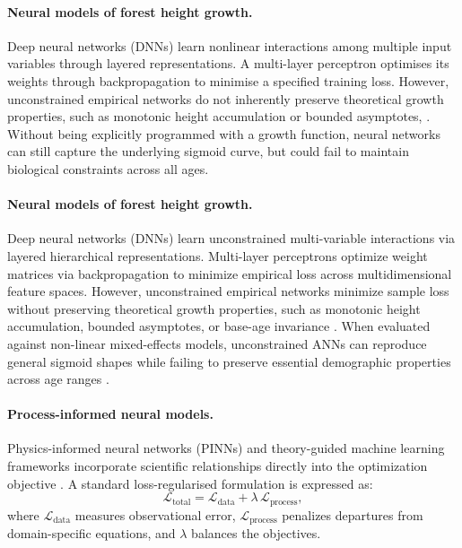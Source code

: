 \paragraph*{Neural models of forest height growth.}
Deep neural networks (DNNs) learn nonlinear interactions among multiple input variables through layered representations. A multi-layer perceptron optimises its weights through backpropagation to minimise a specified training loss. However, unconstrained empirical networks do not inherently preserve theoretical growth properties, such as monotonic height accumulation or bounded asymptotes, \citep{karatepe2022Total_C4_NN}. Without being explicitly programmed with a growth function, neural networks can still capture the underlying sigmoid curve, but could fail to maintain biological constraints across all ages. 


\paragraph*{Neural models of forest height growth.}
Deep neural networks (DNNs) learn unconstrained multi-variable interactions via layered hierarchical representations. Multi-layer perceptrons optimize weight matrices via backpropagation to minimize empirical loss across multidimensional feature spaces. However, unconstrained empirical networks minimize sample loss without preserving theoretical growth properties, such as monotonic height accumulation, bounded asymptotes, or base-age invariance \citep{ercanli2023Comparison_C4_NN,karatepe2022Total_C4_NN}. When evaluated against non-linear mixed-effects models, unconstrained ANNs can reproduce general sigmoid shapes while failing to preserve essential demographic properties across age ranges \citep{ercanli2023Comparison_C4_NN}.


\paragraph*{Process-informed neural models.}
Physics-informed neural networks (PINNs) and theory-guided machine learning frameworks incorporate scientific relationships directly into the optimization objective \citep{karpatne2017Theory_C4_NN,raissi2019Physics_C4_NN,karniadakis2021Physics_C4_NN,willard2022Integrating_C4_NN}. A standard loss-regularised formulation is expressed as:
\begin{equation}
\mathcal{L}_{\text{total}} = \mathcal{L}_{\text{data}} + \lambda\,\mathcal{L}_{\text{process}},
\label{eq:pinn-loss-general}
\end{equation}
where $\mathcal{L}_{\text{data}}$ measures observational error, $\mathcal{L}_{\text{process}}$ penalizes departures from domain-specific equations, and $\lambda$ balances the objectives. 

